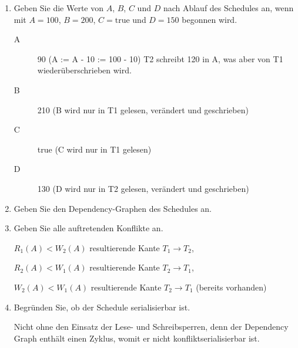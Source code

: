 \documentclass{bschlangaul-aufgabe}
\begin{document}
\begin{enumerate}


\item Geben Sie die Werte von $A$, $B$, $C$ und $D$ nach Ablauf des
Schedules an, wenn mit $A = 100$, $B = 200$, $C = \text{true}$ und $D =
150$ begonnen wird.

\begin{bAntwort}
\begin{description}
\item[A] 90 (A := A - 10 := 100 - 10) T2 schreibt 120 in A, was aber von T1 wiederüberschrieben wird.
\item[B] 210 (B wird nur in T1 gelesen, verändert und geschrieben)
\item[C] true (C wird nur in T1 gelesen)
\item[D] 130 (D wird nur in T2 gelesen, verändert und geschrieben)
\end{description}
\end{bAntwort}


\item Geben Sie den Dependency-Graphen des Schedules an.

\begin{bAntwort}
\end{bAntwort}


\item Geben Sie alle auftretenden Konflikte an.

\begin{bAntwort}
$R_1(A) < W_2(A)$ resultierende Kante $T_1 \rightarrow T_2$,

$R_2(A) < W_1(A)$ resultierende Kante $T_2 \rightarrow T_1$,

$W_2(A) < W_1(A)$ resultierende Kante $T_2 \rightarrow T_1$ (bereits vorhanden)
\end{bAntwort}


\item Begründen Sie, ob der Schedule serialisierbar ist.

\begin{bAntwort}
Nicht ohne den Einsatz der Lese- und Schreibsperren, denn der Dependency
Graph enthält einen Zyklus, womit er nicht konfliktserialisierbar ist.
\end{bAntwort}


\end{enumerate}
\end{document}
